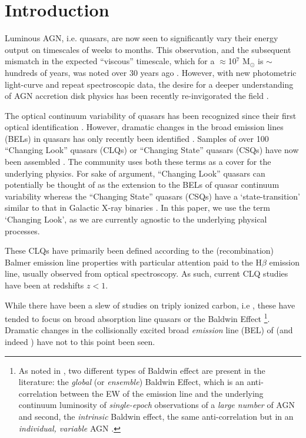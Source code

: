 \documentclass[a4paper,fleqn,usenatbib]{mnras}
\begin{document}
\section{Introduction}
Luminous AGN, i.e. quasars, are now seen to significantly vary their
energy output on timescales of weeks to months.  This observation, and
the subsequent mismatch in the expected ``viscous'' timescale, which
for a $\approx$10$^{7}$ M$_{\odot}$ is $\sim$hundreds of years, was
noted over 30 years ago \citep[e.g.][]{Alloin1985}. However, with new
photometric light-curve and repeat spectroscopic data, the desire for
a deeper understanding of AGN accretion disk physics has been recently
re-invigorated the field \citep[e.g.][]{Lawrence2018, Antonucci2018}.

The optical continuum variability of quasars has been recognized since
their first optical identification 
\citep[e.g.,][]{MatthewsSandage1963, MacLeod2012}.  However, dramatic
changes in the broad emission lines (BELs) in quasars has only
recently been identified \citep[e.g.][]{LaMassa2015}.  Samples of over
100 ``Changing Look'' quasars (CLQs) or ``Changing State'' quasars
(CSQs) have now been assembled \citep[e.g.][]{MacLeod2019,Graham2019}. 
The community uses both these terms as a cover for the
underlying physics. For sake of argument, ``Changing Look'' quasars
can potentially be thought of as the extension to the BELs of quasar
continuum variability \citep[e.g.][]{MacLeod2012} whereas the
``Changing State'' quasars (CSQs) have a `state-transition' similar to
that in Galactic X-ray binaries \citep[e.g][]{NodaDone2018,
Ruan2019}. In this paper, we use the term `Changing Look', as we are
currently agnostic to the underlying physical processes.

These CLQs have primarily been defined according to the
(recombination) Balmer emission line properties with particular
attention paid to the H$\beta$ emission line, usually observed from
optical spectroscopy.  As such, current CLQ studies have been at
redshifts $z<1$.

While there have been a slew of studies on triply ionized carbon, i.e
\civ, these have tended to focus on broad absorption line quasars
\citep[BAL QSOs; see e.g. Table 1][]{Hemler2019} or the Baldwin Effect
\citep[BEff; e.g. ][]{Baldwin1977, Bian2012, Jensen2016,
Hamann2017}\footnote{As noted in \citet{Rakic2017}, two different
types of Baldwin effect are present in the literature: the {\it
global} (or {\it ensemble}) Baldwin Effect, which is an
anti-correlation between the EW of the emission line and the
underlying continuum luminosity of {\it single-epoch} observations of
a {\it large number} of AGN and second, the {\it intrinsic} Baldwin
effect, the same anti-correlation but in an {\it individual, variable}
AGN \citep{PoggePeterson1992}.}.  Dramatic changes in the
collisionally excited broad {\it emission} line (BEL) of \civ (and
indeed \ciii) have not to this point been seen.
\end{document}
